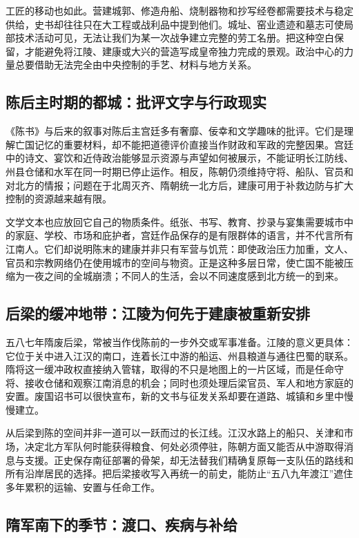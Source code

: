 工匠的移动也如此。营建城郭、修造舟船、烧制器物和抄写经卷都需要技术与稳定供给，史书却往往只在大工程或战利品中提到他们。城址、窑业遗迹和墓志可使局部技术活动可见，无法让我们为某一次战争建立完整的劳工名册。把这种空白保留，才能避免将江陵、建康或大兴的营造写成皇帝独力完成的景观。政治中心的力量总要借助无法完全由中央控制的手艺、材料与地方关系。

\subsection{陈后主时期的都城：批评文字与行政现实}

《陈书》与后来的叙事对陈后主宫廷多有奢靡、佞幸和文学趣味的批评。它们是理解亡国记忆的重要材料，却不能把道德评价直接当作财政和军政的完整因果。宫廷中的诗文、宴饮和近侍政治能够显示资源与声望如何被展示，不能证明长江防线、州县仓储和水军在同一时期已停止运作。相反，陈朝仍须维持守将、船队、官员和对北方的情报；问题在于北周灭齐、隋朝统一北方后，建康可用于补救边防与扩大控制的资源越来越有限。

文学文本也应放回它自己的物质条件。纸张、书写、教育、抄录与宴集需要城市中的家庭、学校、市场和庇护者，宫廷作品保存的是有限群体的语言，并不代言所有江南人。它们却说明陈末的建康并非只有军营与饥荒：即使政治压力加重，文人、官员和宗教网络仍在使用城市的空间与物资。正是这种多层日常，使亡国不能被压缩为一夜之间的全城崩溃；不同人的生活，会以不同速度感到北方统一的到来。

\subsection{后梁的缓冲地带：江陵为何先于建康被重新安排}

五八七年隋废后梁，常被当作伐陈前的一步外交或军事准备。江陵的意义更具体：它位于关中进入江汉的南口，连着长江中游的船运、州县粮道与通往巴蜀的联系。隋将这一缓冲政权直接纳入管辖，取得的不只是地图上的一片区域，而是任命守将、接收仓储和观察江南消息的机会；同时也须处理后梁官员、军人和地方家庭的安置。废国诏书可以很快宣布，新的文书与征发关系却要在道路、城镇和乡里中慢慢建立。

从后梁到陈的空间并非一道可以一跃而过的长江线。江汉水路上的船只、关津和市场，决定北方军队何时能获得粮食、何处必须停驻，陈朝方面又能否从中游取得消息与支援。正史保存南征部署的骨架，却无法替我们精确复原每一支队伍的路线和所有沿岸居民的选择。把后梁接收写入再统一的前史，能防止“五八九年渡江”遮住多年累积的运输、安置与任命工作。

\subsection{隋军南下的季节：渡口、疾病与补给}

